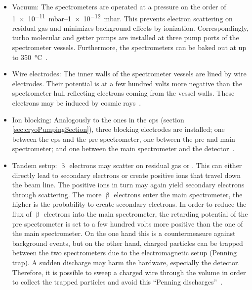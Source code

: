 \begin{itemize}
	\item Vacuum: The spectrometers are operated at a pressure on the order of \SIrange{1e-11}{1e-12}{mbar}. This prevents electron scattering on residual gas and minimizes background effects by ionization. Correspondingly, turbo molecular and getter pumps are installed at three pump ports of the spectrometer vessels. Furthermore, the spectrometers can be baked out at up to \SI{350}{\celsius}~\cite{Arenz2016}.
	
	\item Wire electrodes: The inner walls of the spectrometer vessels are lined by wire electrodes. Their potential is at a few hundred volts more negative than the spectrometer hull reflecting electrons coming from the vessel walls. These electrons may be induced by cosmic rays~\cite{Valerius2009}.
	
	\item Ion blocking: Analogously to the ones in the \gls{cps} (section \ref{sec:cryoPumpingSection}), three blocking electrodes are installed; one between the \gls{cps} and the pre spectrometer, one between the pre and main spectrometer; and one between the main spectrometer and the detector~\cite{Klein2019}.
	
	\item Tandem setup: $\upbeta$ electrons may scatter on residual gas or . This can either directly lead to secondary electrons or create positive ions that travel down the beam line. The positive ions in turn may again yield secondary electrons through scattering. The more $\upbeta$ electrons enter the main spectrometer, the higher is the probability to create secondary electrons. In order to reduce the flux of $\upbeta$ electrons into the main spectrometer, the retarding potential of the pre spectrometer is set to a few hundred volts more positive than the one of the main spectrometer. On the one hand this is a countermeasure against background events, but on the other hand, charged particles can be trapped between the two spectrometers due to the electromagnetic setup (Penning trap). A sudden discharge may harm the hardware, especially the detector. Therefore, it is possible to sweep a charged wire through the volume in order to collect the trapped particles and avoid this ``Penning discharges''~\cite{Valerius2009}.
\end{itemize}